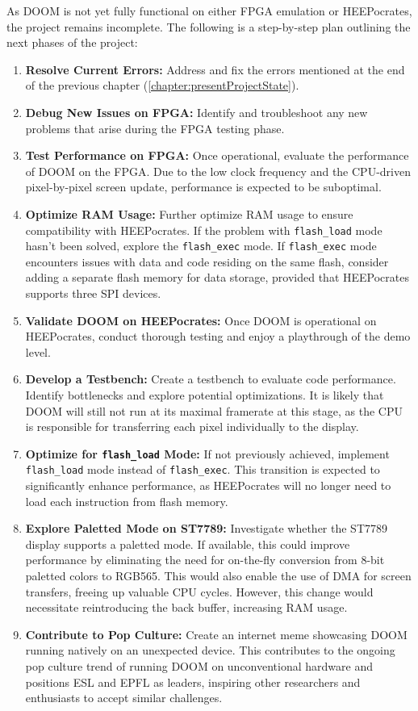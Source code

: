 As DOOM is not yet fully functional on either FPGA emulation or HEEPocrates, the project remains incomplete. The following is a step-by-step plan outlining the next phases of the project:


\begin{enumerate}
    \item \textbf{Resolve Current Errors:} Address and fix the errors mentioned at the end of the previous chapter (\ref{chapter:presentProjectState}).
    \item \textbf{Debug New Issues on FPGA:} Identify and troubleshoot any new problems that arise during the FPGA testing phase.
    \item \textbf{Test Performance on FPGA:} Once operational, evaluate the performance of DOOM on the FPGA. Due to the low clock frequency and the CPU-driven pixel-by-pixel screen update, performance is expected to be suboptimal.
    \item \textbf{Optimize RAM Usage:} Further optimize RAM usage to ensure compatibility with HEEPocrates. If the problem with \texttt{flash\_load} mode hasn't been solved, explore the \texttt{flash\_exec} mode. If \texttt{flash\_exec} mode encounters issues with data and code residing on the same flash, consider adding a separate flash memory for data storage, provided that HEEPocrates supports three SPI devices.
    \item \textbf{Validate DOOM on HEEPocrates:} Once DOOM is operational on HEEPocrates, conduct thorough testing and enjoy a playthrough of the demo level.
    \item \textbf{Develop a Testbench:} Create a testbench to evaluate code performance. Identify bottlenecks and explore potential optimizations. It is likely that DOOM will still not run at its maximal framerate at this stage, as the CPU is responsible for transferring each pixel individually to the display.
    \item \textbf{Optimize for \texttt{flash\_load} Mode:} If not previously achieved, implement \texttt{flash\_load} mode instead of \texttt{flash\_exec}. This transition is expected to significantly enhance performance, as HEEPocrates will no longer need to load each instruction from flash memory.
    \item \textbf{Explore Paletted Mode on ST7789:} Investigate whether the ST7789 display supports a paletted mode. If available, this could improve performance by eliminating the need for on-the-fly conversion from 8-bit paletted colors to RGB565. This would also enable the use of DMA for screen transfers, freeing up valuable CPU cycles. However, this change would necessitate reintroducing the back buffer, increasing RAM usage.
    \item \textbf{Contribute to Pop Culture:} Create an internet meme showcasing DOOM running natively on an unexpected device. This contributes to the ongoing pop culture trend of running DOOM on unconventional hardware and positions ESL and EPFL as leaders, inspiring other researchers and enthusiasts to accept similar challenges.
\end{enumerate}